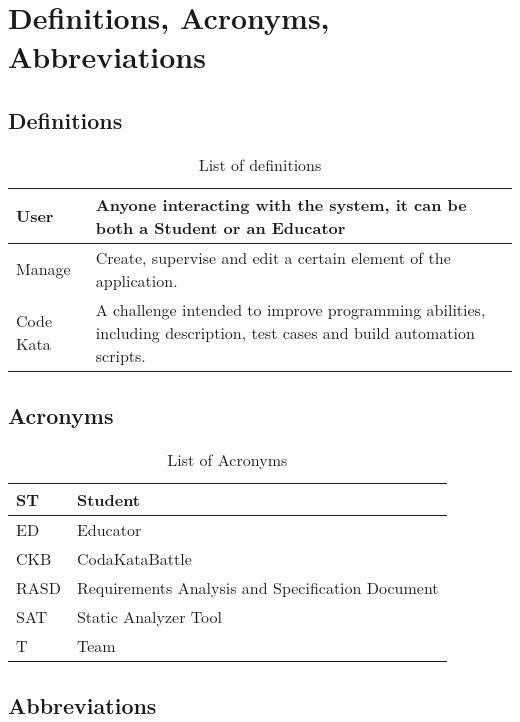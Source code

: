 \section{Definitions, Acronyms, Abbreviations}
\label{s:Definitions_Acronyms_Abbreviations}%

\subsection{Definitions}
\label{ss:Definitions}

\begin{table}[H]
  \begin{tabular}{|l|p{}|}

    \hline
    User & Anyone interacting with the system, it can be both a Student or an Educator    \\
    \hline
    Manage & Create, supervise and edit a certain element of the application. \\
    \hline
    Code Kata & A challenge intended to improve programming abilities, including description, test cases and build automation scripts. \\
    \hline
  \end{tabular}
  \caption{List of definitions}
  \label{tab:definitions}
\end{table}

\subsection{Acronyms}
\label{ss:Acronyms}

\begin{table}[H]
  \begin{tabular}{|l|l|}

    \hline
    ST & Student \\
    \hline
    ED & Educator \\
    \hline
    CKB & CodaKataBattle \\
    \hline
    RASD & Requirements Analysis and Specification Document     \\
    \hline
    SAT & Static Analyzer Tool    \\
    \hline
    T & Team    \\
    \hline
  \end{tabular}
  \caption{List of Acronyms}
  \label{tab:acronyms}
\end{table}

\subsection{Abbreviations}
\label{ss:Abbreviations}


